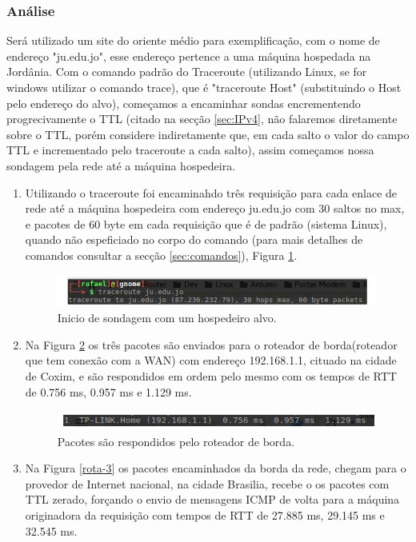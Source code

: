 \documentclass[
	article,			%
	11pt,				%
	oneside,			%
	a4paper,			%
	english,			%
	brazil,				%
	sumario=tradicional
	]{abntex2}
\begin{document}
\subsubsection{Análise}
 Será utilizado um site do oriente médio para exemplificação, com o nome de endereço "ju.edu.jo", esse endereço pertence a uma máquina hospedada na Jordânia.
 Com o comando padrão do Traceroute (utilizando Linux, se for windows utilizar o comando trace), que é "traceroute Host" (substituindo o Host pelo endereço do alvo), começamos a encaminhar sondas encrementendo progrecivamente o TTL (citado na secção \ref{sec:IPv4}, não falaremos diretamente sobre o TTL, porém considere indiretamente que, em cada salto o valor do campo TTL e incrementado pelo traceroute a cada salto), assim começamos nossa sondagem pela rede até a máquina hospedeira. 
 \begin{enumerate}
 	\item
 	Utilizando o traceroute foi encaminahdo três requisição para cada enlace de rede até a máquina hospedeira com endereço ju.edu.jo com 30 saltos no max, e pacotes de 60 byte em cada requisição que é de padrão (sistema Linux), quando não espeficiado no corpo do comando (para mais detalhes de comandos consultar a secção \ref{sec:comandos}), Figura \ref{rota-1}.
 	
 		\begin{figure}[H]
	 		\centering
	 		\includegraphics[scale=0.65]{./rota-1.png}
	 		\caption{Inicio de sondagem com um hospedeiro alvo.}
	 		\label{rota-1}
	 	\end{figure}
 	
 	\item
 	Na Figura \ref{rota-2} os três pacotes são enviados para o roteador de borda(roteador que tem conexão com a WAN) com endereço 192.168.1.1, cituado na cidade de Coxim, e são respondidos em ordem pelo mesmo com os tempos de RTT de 0.756 ms, 0.957 ms e 1.129 ms.
 	\begin{figure}[H]
 		\centering
 		\includegraphics[scale=0.7]{./rota-2.png}
 		\caption{Pacotes são respondidos pelo roteador de borda.}
 		\label{rota-2}
 	\end{figure}
 	
 	\item
 	Na Figura \ref{rota-3} os pacotes encaminhados da borda da rede, chegam para o provedor de Internet nacional, na cidade Brasilia, recebe o os pacotes com TTL zerado, forçando o envio de mensagens ICMP de volta para a máquina originadora da requisição com tempos de RTT de 27.885 ms, 29.145 ms e 32.545 ms.
 	

\end{enumerate}
\end{document}
